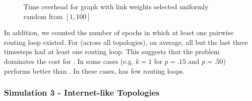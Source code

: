 \begin{figure*}[t]
\centering
{}
\caption{Time overhead for \er graph with link weights selected uniformly random from $[1,100]$}
\label{fig:epoch-rand}
\end{figure*} 





In addition, we counted the number of epochs in which at least one pairwise routing loop existed.  For \second (across all topologies), on average, all but the last three 
timesteps had at least one routing loop.  This suggests that the \infinity problem dominates the cost for \seconds. 
In some cases (e.g. $k=1$ for $p=.15$ and $p=.50$) \second performs better than \purges.  In these cases, \second has few routing loops.






\subsubsection{Simulation 3 - Internet-like Topologies}

